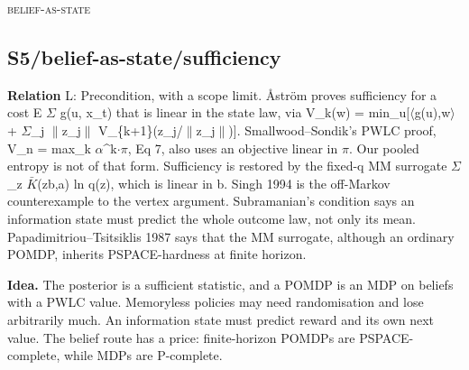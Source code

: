 \documentclass[10pt]{article}
\begin{document}
\medskip\textsc{belief-as-state}

\subsection{S5/belief-as-state/sufficiency}\label{node:S5-S5-belief-as-state-sufficiency}
\textbf{Relation} \textsf{L}: Precondition, with a scope limit. \AA{}str\"om proves sufficiency for a cost E \ensuremath{\Sigma} g(u, x\_t) that is linear in the state law, via V\_k(w) = min\_u[\ensuremath{\langle}g(u),w\ensuremath{\rangle} + \ensuremath{\Sigma}\_j \ensuremath{\|}z\_j\ensuremath{\|} V\_\{k+1\}(z\_j/\ensuremath{\|}z\_j\ensuremath{\|})]. Smallwood--Sondik's PWLC proof, V\_n = max\_k \ensuremath{\alpha}\^{}k\ensuremath{\cdot}\ensuremath{\pi}, Eq 7, also uses an objective linear in \ensuremath{\pi}. Our pooled entropy is not of that form. Sufficiency is restored by the fixed-q MM surrogate \ensuremath{\Sigma}\_z \ensuremath{\bar{K}}(z\textbar{}b,a) ln q(z), which is linear in b. Singh 1994 is the off-Markov counterexample to the vertex argument. Subramanian's condition says an information state must predict the whole outcome law, not only its mean. Papadimitriou--Tsitsiklis 1987 says that the MM surrogate, although an ordinary POMDP, inherits PSPACE-hardness at finite horizon.

\textbf{Idea.} The posterior is a sufficient statistic, and a POMDP is an MDP on beliefs with a PWLC value. Memoryless policies may need randomisation and lose arbitrarily much. An information state must predict reward and its own next value. The belief route has a price: finite-horizon POMDPs are PSPACE-complete, while MDPs are P-complete.
\end{document}
